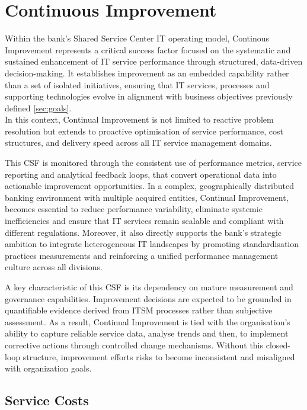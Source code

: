 
\chapter{Continuous Improvement}
\label{sec:continuousimprovement}

Within the bank's Shared Service Center IT operating model, Continous Improvement represents a critical success factor focused on the systematic and sustained enhancement of IT service performance through structured, data-driven decision-making. It establishes improvement as an embedded capability rather than a set of isolated initiatives, ensuring that IT services, processes and supporting technologies evolve in alignment with business objectives previously defined \ref{sec:goals}. \\
In this context, Continual Improvement is not limited to reactive problem resolution but extends to proactive optimisation of service performance, cost structures, and delivery speed across all IT service management domains.

This CSF is monitored through the consistent use of performance metrics, service reporting and analytical feedback loops, that convert operational data into actionable improvement opportunities. In a complex, geographically distributed banking environment with multiple acquired entities, Continual Improvement, becomes essential to reduce performance variability, eliminate systemic inefficiencies and ensure that IT services remain scalable and compliant with different regulations. 
Moreover, it also directly supports the bank's strategic ambition to integrate heterogeneous IT landscapes by promoting standardisation practices measurements and reinforcing a unified performance management culture across all divisions.

A key characteristic of this CSF is its dependency on mature measurement and governance capabilities. Improvement decisions are expected to be grounded in quantifiable evidence derived from ITSM processes rather than subjective assessment. As a result, Continual Improvement is tied with the organisation's ability to capture reliable service data, analyse trends and then, to implement corrective actions through controlled change mechanisms. Without this closed-loop structure, improvement efforts risks to become inconsistent and misaligned with organization goals.


\section{Service Costs}
\label{subs:servicecosts}


